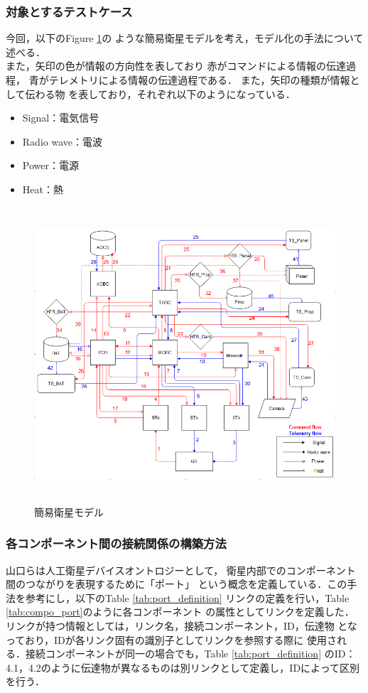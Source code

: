 \documentclass[11pt]{article}
\begin{document}
\subsubsection{対象とするテストケース}
今回，以下のFigure \ref{fig:simple_sat}の
ような簡易衛星モデルを考え，モデル化の手法について
述べる．\\
また，矢印の色が情報の方向性を表しており
赤がコマンドによる情報の伝達過程，
青がテレメトリによる情報の伝達過程である．
また，矢印の種類が情報として伝わる物
を表しており，それぞれ以下のようになっている．
\begin{itemize}
   \item Signal：電気信号
   \item Radio wave：電波
   \item Power：電源
   \item Heat：熱
\end{itemize}
\begin{figure}[H]
   \centering
      \includegraphics[height=11.0cm]{figure/satellite_diagram.PNG}
      \caption{簡易衛星モデル}
      \label{fig:simple_sat}
\end{figure}

\subsubsection{各コンポーネント間の接続関係の構築方法}
山口ら\cite{Yamaguchi2014}は人工衛星デバイスオントロジーとして，
衛星内部でのコンポーネント間のつながりを表現するために「ポート」%
という概念を定義している．この手法を参考にし，以下のTable \ref{tab:port_definition}
リンクの定義を行い，Table \ref{tab:compo_port}のように各コンポーネント
の属性としてリンクを定義した．\\
リンクが持つ情報としては，リンク名，接続コンポーネント，ID，伝達物
となっており，IDが各リンク固有の識別子としてリンクを参照する際に
使用される．接続コンポーネントが同一の場合でも，Table \ref{tab:port_definition}
のID：4.1，4.2のように伝達物が異なるものは別リンクとして定義し，IDによって区別
を行う．
\end{document}
